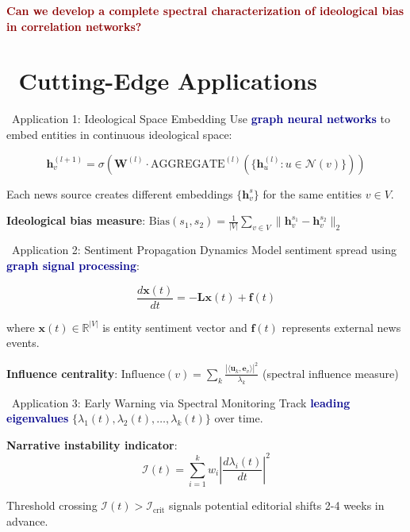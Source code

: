 \documentclass[11pt]{article}
\newcommand{\bigquestion}[1]{
\begin{center}
\begin{tcolorbox}[colback=darkred!15, colframe=darkred, width=0.95\textwidth, arc=3mm, boxrule=2pt]
\centering \Large \textbf{\textcolor{darkred}{#1}}
\end{tcolorbox}
\end{center}
}
\newcommand{\highlight}[1]{\textcolor{darkblue}{\textbf{#1}}}
\begin{document}
\bigquestion{Can we develop a complete spectral characterization of ideological bias in correlation networks?}

\section{\faRocket \, Cutting-Edge Applications}

\begin{applicationbox}{\faBrain \, Application 1: Ideological Space Embedding}
Use \highlight{graph neural networks} to embed entities in continuous ideological space:

$$\mathbf{h}_v^{(l+1)} = \sigma\left(\mathbf{W}^{(l)} \cdot \text{AGGREGATE}^{(l)}\left(\{\mathbf{h}_u^{(l)} : u \in \mathcal{N}(v)\}\right)\right)$$

Each news source creates different embeddings $\{\mathbf{h}_v^s\}$ for the same entities $v \in V$.

\textbf{Ideological bias measure}: $\text{Bias}(s_1, s_2) = \frac{1}{|V|} \sum_{v \in V} \|\mathbf{h}_v^{s_1} - \mathbf{h}_v^{s_2}\|_2$
\end{applicationbox}

\begin{applicationbox}{\faWaveSquare \, Application 2: Sentiment Propagation Dynamics}
Model sentiment spread using \highlight{graph signal processing}:

$$\frac{d\mathbf{x}(t)}{dt} = -\mathbf{L}\mathbf{x}(t) + \mathbf{f}(t)$$

where $\mathbf{x}(t) \in \mathbb{R}^{|V|}$ is entity sentiment vector and $\mathbf{f}(t)$ represents external news events.

\textbf{Influence centrality}: $\text{Influence}(v) = \sum_{k} \frac{|\langle \mathbf{u}_k, \mathbf{e}_v \rangle|^2}{\lambda_k}$ (spectral influence measure)
\end{applicationbox}

\begin{applicationbox}{\faSearch \, Application 3: Early Warning via Spectral Monitoring}
Track \highlight{leading eigenvalues} $\{\lambda_1(t), \lambda_2(t), \ldots, \lambda_k(t)\}$ over time.

\textbf{Narrative instability indicator}:
$$\mathcal{I}(t) = \sum_{i=1}^k w_i \left|\frac{d\lambda_i(t)}{dt}\right|^2$$

Threshold crossing $\mathcal{I}(t) > \mathcal{I}_{\text{crit}}$ signals potential editorial shifts 2-4 weeks in advance.
\end{applicationbox}
\end{document}
